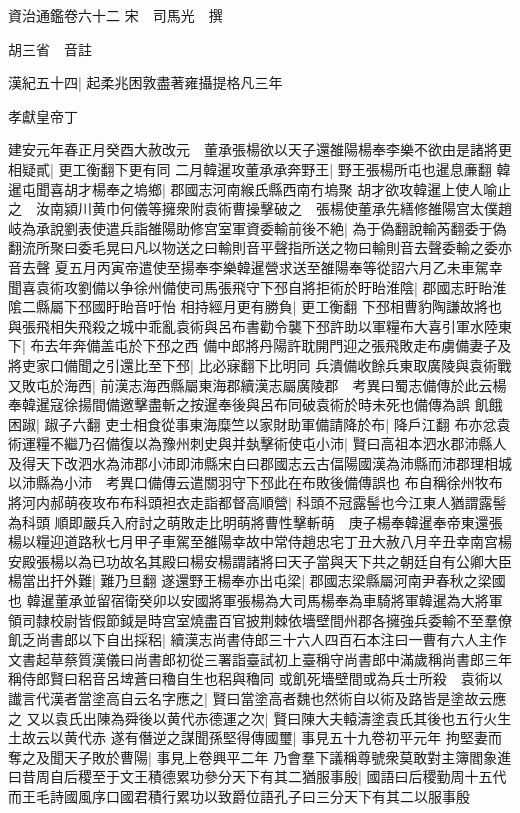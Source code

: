 資治通鑑卷六十二
宋　司馬光　撰

胡三省　音註

漢紀五十四|{
	起柔兆困敦盡著雍攝提格凡三年}


孝獻皇帝丁

建安元年春正月癸酉大赦改元　董承張楊欲以天子還雒陽楊奉李樂不欲由是諸將更相疑貳|{
	更工衡翻下更有同}
二月韓暹攻董承承奔野王|{
	野王張楊所屯也暹息亷翻}
韓暹屯聞喜胡才楊奉之塢鄉|{
	郡國志河南緱氏縣西南冇塢聚}
胡才欲攻韓暹上使人喻止之　汝南潁川黄巾何儀等擁衆附袁術曹操擊破之　張楊使董承先繕修雒陽宫太僕趙岐為承說劉表使遣兵詣雒陽助修宫室軍資委輸前後不絶|{
	為于偽翻說輸芮翻委于偽翻流所聚曰委毛晃曰凡以物送之曰輸則音平聲指所送之物曰輸則音去聲委輸之委亦音去聲}
夏五月丙寅帝遣使至揚奉李樂韓暹營求送至雒陽奉等從詔六月乙未車駕幸聞喜袁術攻劉備以争徐州備使司馬張飛守下邳自將拒術於盱眙淮陰|{
	郡國志盱眙淮隂二縣屬下邳國盱眙音吁怡}
相持經月更有勝負|{
	更工衡翻}
下邳相曹豹陶謙故將也與張飛相失飛殺之城中乖亂袁術與呂布書勸令襲下邳許助以軍糧布大喜引軍水陸東下|{
	布去年奔備盖屯於下邳之西}
備中郎將丹陽許耽開門迎之張飛敗走布虜備妻子及將吏家口備聞之引還比至下邳|{
	比必寐翻下比明同}
兵潰備收餘兵東取廣陵與袁術戰又敗屯於海西|{
	前漢志海西縣屬東海郡續漢志屬廣陵郡　考異曰蜀志備傳於此云楊奉韓暹寇徐揚間備邀擊盡斬之按暹奉後與呂布同破袁術於時未死也備傳為誤}
飢餓困踧|{
	踧子六翻}
吏士相食從事東海糜竺以家財助軍備請降於布|{
	降戶江翻}
布亦忿袁術運糧不繼乃召備復以為豫州刺史與并埶擊術使屯小沛|{
	賢曰高祖本泗水郡沛縣人及得天下改泗水為沛郡小沛即沛縣宋白曰郡國志云古偪陽國漢為沛縣而沛郡理相城以沛縣為小沛　考異口備傳云遣關羽守下邳此在布敗後備傳誤也}
布自稱徐州牧布將河内郝萌夜攻布布科頭袒衣走詣都督高順營|{
	科頭不冠露髻也今江東人猶謂露髻為科頭}
順即嚴兵入府討之萌敗走比明萌將曹性擊斬萌　庚子楊奉韓暹奉帝東還張楊以糧迎道路秋七月甲子車駕至雒陽幸故中常侍趙忠宅丁丑大赦八月辛丑幸南宫楊安殿張楊以為已功故名其殿曰楊安楊謂諸將曰天子當與天下共之朝廷自有公卿大臣楊當出扞外難|{
	難乃旦翻}
遂還野王楊奉亦出屯梁|{
	郡國志梁縣屬河南尹春秋之梁國也}
韓暹董承並留宿衛癸卯以安國將軍張楊為大司馬楊奉為車騎將軍韓暹為大將軍領司隸校尉皆假節鉞是時宫室燒盡百官披荆棘依墻壁間州郡各擁強兵委輸不至羣僚飢乏尚書郎以下自出採稆|{
	續漢志尚書侍郎三十六人四百石本注曰一曹有六人主作文書起草蔡質漢儀曰尚書郎初從三署詣臺試初上臺稱守尚書郎中滿歲稱尚書郎三年稱侍郎賢曰稆音呂埤蒼曰穭自生也稆與穭同}
或飢死墻壁間或為兵士所殺　袁術以䜟言代漢者當塗高自云名字應之|{
	賢曰當塗高者魏也然術自以術及路皆是塗故云應之}
又以袁氏出陳為舜後以黄代赤德運之次|{
	賢曰陳大夫轅濤塗袁氏其後也五行火生土故云以黄代赤}
遂有僭逆之謀聞孫堅得傳國璽|{
	事見五十九卷初平元年}
拘堅妻而奪之及聞天子敗於曹陽|{
	事見上卷興平二年}
乃會羣下議稱尊號衆莫敢對主簿閻象進曰昔周自后稷至于文王積德累功參分天下有其二猶服事殷|{
	國語曰后稷勤周十五代而王毛詩國風序口國君積行累功以致爵位語孔子曰三分天下有其二以服事殷}
